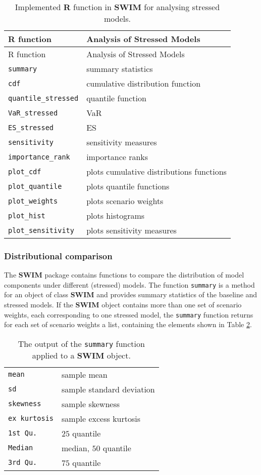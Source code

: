 \documentclass[
]{article}
\begin{document}
\begin{longtable}[]{@{}ll@{}}
\caption{\label{tab:Ranalysis} Implemented \textbf{R} function in \textbf{SWIM} for analysing stressed models.}\tabularnewline
\toprule
R function & Analysis of Stressed Models\tabularnewline
\midrule
\endfirsthead
\toprule
R function & Analysis of Stressed Models\tabularnewline
\midrule
\endhead
\texttt{summary} & summary statistics\tabularnewline
\texttt{cdf} & cumulative distribution function\tabularnewline
\texttt{quantile\_stressed} & quantile function\tabularnewline
\texttt{VaR\_stressed} & VaR\tabularnewline
\texttt{ES\_stressed} & ES\tabularnewline
\texttt{sensitivity} & sensitivity measures\tabularnewline
\texttt{importance\_rank} & importance ranks\tabularnewline
\texttt{plot\_cdf} & plots cumulative distributions functions\tabularnewline
\texttt{plot\_quantile} & plots quantile functions\tabularnewline
\texttt{plot\_weights} & plots scenario weights\tabularnewline
\texttt{plot\_hist} & plots histograms\tabularnewline
\texttt{plot\_sensitivity} & plots sensitivity measures\tabularnewline
\bottomrule
\end{longtable}

\hypertarget{distributional-comparison}{%
\subsubsection{Distributional comparison}\label{distributional-comparison}}

The \textbf{SWIM} package contains functions to compare the distribution of model components under different (stressed) models. The function \texttt{summary} is a method for an object of class \textbf{SWIM} and provides summary statistics of the baseline and stressed models. If the \textbf{SWIM} object contains more than one set of scenario weights, each corresponding to one stressed model, the \texttt{summary} function returns for each set of scenario weights a list, containing the elements shown in Table \ref{tab:summary}.

\begin{longtable}[]{@{}ll@{}}
\caption{\label{tab:summary} The output of the \texttt{summary} function applied to a \textbf{SWIM} object.}\tabularnewline
\toprule
\endhead
\texttt{mean} & sample mean\tabularnewline
\texttt{sd} & sample standard deviation\tabularnewline
\texttt{skewness} & sample skewness\tabularnewline
\texttt{ex\ kurtosis} & sample excess kurtosis\tabularnewline
\texttt{1st\ Qu.} & \(25%
\) quantile\tabularnewline
\texttt{Median} & median, \(50%
\) quantile\tabularnewline
\texttt{3rd\ Qu.} & \(75%
\) quantile\tabularnewline
\bottomrule
\end{longtable}
\end{document}
